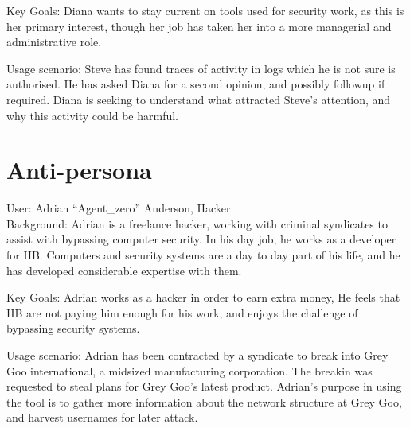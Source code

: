Key Goals: Diana wants to stay current on tools used for security work, as this is her primary interest, though her job has taken her into a more managerial and administrative role. 

Usage scenario:
Steve has found traces of activity in logs which he is not sure is authorised. He has asked Diana for a second opinion, and possibly followup if required. Diana is seeking to understand what attracted Steve's attention, and why this activity could be harmful. 

\section{Anti-persona}
User: Adrian ``Agent\_zero'' Anderson, Hacker \\

Background: Adrian is a freelance hacker, working with criminal syndicates to assist with bypassing computer security. In his day job, he works as a developer for HB. Computers and security systems are a day to day part of his life, and he has developed considerable expertise with them. 

Key Goals: Adrian works as a hacker in order to earn extra money, He feels that HB are not paying him enough for his work, and enjoys the challenge of bypassing security systems.

Usage scenario: Adrian has been contracted by a syndicate to break into Grey Goo international,  a midsized manufacturing corporation. The breakin was requested to steal plans for Grey Goo's latest product. Adrian's purpose in using the tool is to gather more information about the network structure at Grey Goo, and harvest usernames for later attack.